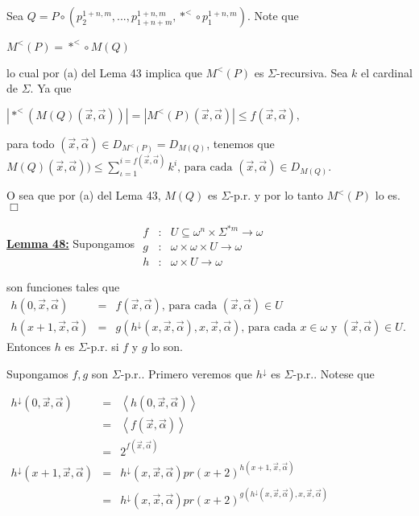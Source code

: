 \PROOF Sea \(Q=P\circ \left( p_{2}^{1+n,m},...,p_{1+n+m}^{1+n,m},\ast ^{< }\circ p_{1}^{1+n,m}\right) \). Note que

\(\displaystyle M^{< }(P)=\ast ^{< }\circ M(Q) \)

lo cual por (a) del Lema 43 implica que \(M^{< }(P)\) es \( \Sigma \)-recursiva.
Sea \(k\) el cardinal de \(\Sigma \). Ya que

\(\displaystyle \left\vert \ast ^{< }(M(Q)(\vec{x},\vec{\alpha}))\right\vert =\left\vert M^{< }(P)(\vec{x},\vec{\alpha})\right\vert \leq f(\vec{x},\vec{\alpha})\text{, } \)

para todo \((\vec{x},\vec{\alpha})\in D_{M^{< }(P)}=D_{M(Q)}\), tenemos que
\(\displaystyle M(Q)(\vec{x},\vec{\alpha}))\leq \sum_{\iota =1}^{i=f(\vec{x},\vec{\alpha} )}k^{i}\text{, para cada }(\vec{x},\vec{\alpha})\in D_{M(Q)}\text{.} \)

O sea que por (a) del Lema 43, \(M(Q)\) es \(\Sigma \)-p.r. y por lo tanto \(M^{< }(P)\) lo es. \(\Box\)


\textbf{\underline{Lemma 48:}} Supongamos
\(\displaystyle \begin{array}{rcl} f & :& U\subseteq \omega ^{n}\times \Sigma ^{\ast m}\rightarrow \omega \\ g & :& \omega \times \omega \times U\rightarrow \omega \\ h & :& \omega \times U\rightarrow \omega \end{array} \)

son funciones tales que
\(\displaystyle \begin{array}{rcl} h(0,\vec{x},\vec{\alpha}) & =& f(\vec{x},\vec{\alpha})\text{, para cada }(\vec{ x},\vec{\alpha})\in U \\ h(x+1,\vec{x},\vec{\alpha}) & =& g(h^{\downarrow }(x,\vec{x},\vec{\alpha}),x, \vec{x},\vec{\alpha})\text{, para cada }x\in \omega \text{ y }(\vec{x},\vec{ \alpha})\in U\text{.} \end{array} \)
Entonces \(h\) es \(\Sigma \)-p.r. si \(f\) y \(g\) lo son.

\PROOF Supongamos \(f,g\) son \(\Sigma \)-p.r.. Primero veremos que \(h^{\downarrow }\) es \(\Sigma \)-p.r.. Notese que

\(\displaystyle \begin{array}{rcl} h^{\downarrow }(0,\vec{x},\vec{\alpha}) & =& \left\langle h(0,\vec{x},\vec{ \alpha})\right\rangle \\ & =& \left\langle f(\vec{x},\vec{\alpha})\right\rangle \\ & =& 2^{f(\vec{x},\vec{\alpha})} \\ h^{\downarrow }(x+1,\vec{x},\vec{\alpha}) & =& h^{\downarrow }(x,\vec{x},\vec{ \alpha})pr(x+2)^{h(x+1,\vec{x},\vec{\alpha})} \\ & =& h^{\downarrow }(x,\vec{x},\vec{\alpha})pr(x+2)^{g(h^{\downarrow }(x,\vec{x },\vec{\alpha}),x,\vec{x},\vec{\alpha})} \end{array} \)


